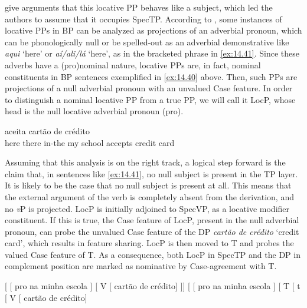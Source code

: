 \documentclass[output=paper]{langsci/langscibook}
\begin{document}
\citet{AvelarCyrino2008} give arguments that this locative PP behaves like a
subject, which led the authors to assume that it occupies SpecTP. According to
\citet{Avelar2006}, some instances of locative PPs in \gls{BP} can be analyzed
as projections of an adverbial pronoun, which can be phonologically null or be
spelled-out as an adverbial demonstrative like \emph{aqui} ‘here’ or
\emph{aí/ali/lá} ‘here’, as in the bracketed phrase in \eqref{ex:14.41}. Since
these adverbs have a (pro)nominal nature, locative PPs are, in fact, nominal
constituents in \gls{BP} sentences exemplified in \eqref{ex:14.40} above.
Then, such PPs are projections of a null adverbial pronoun with an unvalued
Case feature. In order to distinguish a nominal locative PP from a true PP, we
will call it LocP, whose head is the null locative adverbial pronoun
(pro\tss{\Loc}).

\ea\label{ex:14.41}
     aceita {cartão de crédito}\\
            {} \hphantom{(}here {} there in-the my school {} accepts {credit card}\\
\z

Assuming that this analysis is on the right track, a logical step forward is
the claim that, in sentences like \eqref{ex:14.41}, no null subject is present
in the TP layer. It is likely to be the case that no null subject is present at
all. This means that the external argument of the verb is completely absent
from the derivation, and no \emph{v}P is projected. LocP is initially adjoined
to SpecVP, as a locative modifier constituent. If this is true, the Case
feature of LocP, present in the null adverbial pronoun, can probe the unvalued
Case feature of the DP \emph{cartão de crédito} ‘credit card’, which
results in feature sharing. LocP is then moved to T and probes the valued Case
feature of T. As a consequence, both LocP in SpecTP and the DP in complement
position are marked as nominative by Case-agreement with T.

\ea\label{ex:14.42}
    \ea {}[ [ pro\tss{\Loc} na minha escola ]
            [ V [ cartão de crédito] ]]
    \ex {}[ [ pro\tss{\Loc} na minha escola ]
            [ T [ t [ V
                [ cartão de crédito]
    \z
\z
\end{document}

